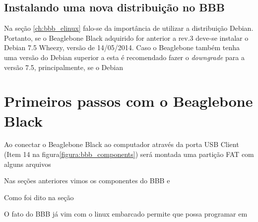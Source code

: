 \subsection{Instalando uma nova distribuição no BBB}

Na seção \ref{ch:bbb_elinux} falo-se da importância de utilizar a distribuição Debian. Portanto, se o Beaglebone Black adquirido for anterior a rev.3 deve-se instalar o Debian 7.5 Wheezy, versão de 14/05/2014. Caso o Beaglebone também tenha uma versão do Debian superior a esta é recomendado fazer o \emph{downgrade} para a versão 7.5, principalmente, se o Debian 

\section{Primeiros passos com o Beaglebone Black}
\label{ch:bbb_firststeps}

Ao conectar o Beaglebone Black ao computador através da porta USB Client (Item 14 na figura\ref{figura:bbb_components}) será montada uma partição FAT com alguns arquivos 

Nas seções anteriores vimos os componentes do BBB e 

Como foi dito na seção \

O fato do BBB já vim com o linux embarcado permite que possa programar em 